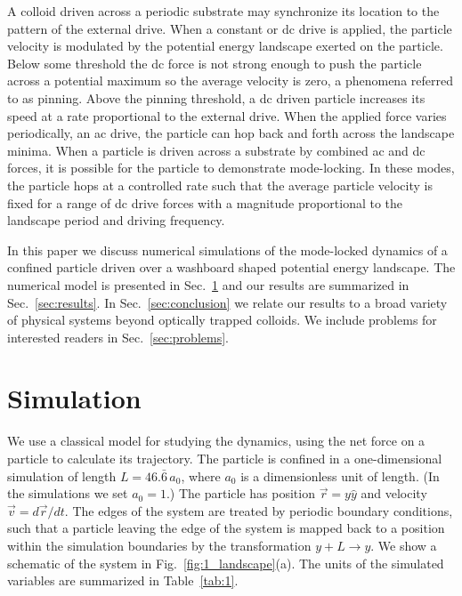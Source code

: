 \documentclass[preprint,showpacs,preprintnumbers,amsmath,amssymb,aps,prb]{revtex4-1}
\theoremstyle{remark}
\begin{document}
A colloid driven across a periodic
substrate may 
synchronize its location
to the pattern of the external drive.
When 
a constant or 
dc drive is applied,
the particle velocity is modulated by 
the potential energy landscape exerted on the particle.   
Below some threshold  
the dc force is not strong enough to push the particle
across a potential maximum so the average velocity is zero,
a phenomena referred to as pinning.\cite{Reichhardt2017}
Above the pinning threshold,
a dc driven particle
increases its speed at a rate proportional
to the external drive.  
When the applied force varies periodically,
an ac drive,
the particle can hop back and forth across
the landscape minima.
When a particle is driven across a substrate
by combined 
ac and dc forces,
it is possible for the particle to demonstrate 
mode-locking.
In these modes,  
the particle hops at a controlled rate such that 
the average particle velocity is 
fixed for a range of dc drive forces
with a magnitude proportional to the
landscape period and driving frequency.\cite{Reichhardt2015}

In this paper we discuss numerical simulations 
of the mode-locked dynamics
of a confined particle driven over
a washboard shaped potential energy landscape.
The numerical model is presented in Sec.~\ref{sec:MD} and 
our results are summarized in
Sec.~\ref{sec:results}. In Sec.~\ref{sec:conclusion}
we relate  our results 
to a broad variety of physical systems beyond 
optically trapped colloids.
We include problems for interested readers 
in Sec.~\ref{sec:problems}.

\section{Simulation}
\label{sec:MD}
We use a classical model for 
studying the dynamics, 
using the net force on a particle to calculate
its trajectory.
The particle is confined in a one-dimensional %
simulation of length $L=46.\bar{6}\,a_0$, %
where $a_0$ is a dimensionless unit of length.
(In the simulations we set $a_0 = 1$.)
The particle 
has
position $\vec{r} = y \hat{y}$ %
and velocity $\vec{v} = d\vec{r}/dt$.
The edges of the system are treated by
periodic boundary conditions,
such that a particle leaving the edge of the system is mapped
back to a position within the simulation boundaries 
by the transformation $y+L \rightarrow y$. %
We show a schematic of the system in Fig.~\ref{fig:1_landscape}(a).
The units of the simulated variables are summarized in Table~\ref{tab:1}.
\end{document}
